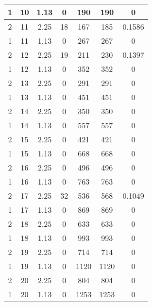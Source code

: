 \documentclass[letterpaper, 12pt]{article}
\begin{document}
\begin{longtable}{|c|c|c|c|c|c|c|}
\hline
1 & 10 & 1.13 & 0 & 190 & 190 & 0 \\
\hline
2 & 11 & 2.25 & 18 & 167 & 185 & 0.1586 \\
\hline
1 & 11 & 1.13 & 0 & 267 & 267 & 0 \\
\hline
2 & 12 & 2.25 & 19 & 211 & 230 & 0.1397 \\
\hline
1 & 12 & 1.13 & 0 & 352 & 352 & 0 \\
\hline
2 & 13 & 2.25 & 0 & 291 & 291 & 0 \\
\hline
1 & 13 & 1.13 & 0 & 451 & 451 & 0 \\
\hline
2 & 14 & 2.25 & 0 & 350 & 350 & 0 \\
\hline
1 & 14 & 1.13 & 0 & 557 & 557 & 0 \\
\hline
2 & 15 & 2.25 & 0 & 421 & 421 & 0 \\
\hline
1 & 15 & 1.13 & 0 & 668 & 668 & 0 \\
\hline
2 & 16 & 2.25 & 0 & 496 & 496 & 0 \\
\hline
1 & 16 & 1.13 & 0 & 763 & 763 & 0 \\
\hline
2 & 17 & 2.25 & 32 & 536 & 568 & 0.1049 \\
\hline
1 & 17 & 1.13 & 0 & 869 & 869 & 0 \\
\hline
2 & 18 & 2.25 & 0 & 633 & 633 & 0 \\
\hline
1 & 18 & 1.13 & 0 & 993 & 993 & 0 \\
\hline
2 & 19 & 2.25 & 0 & 714 & 714 & 0 \\
\hline
1 & 19 & 1.13 & 0 & 1120 & 1120 & 0 \\
\hline
2 & 20 & 2.25 & 0 & 804 & 804 & 0 \\
\hline
1 & 20 & 1.13 & 0 & 1253 & 1253 & 0 \\
\hline
\end{longtable}
\end{document}
